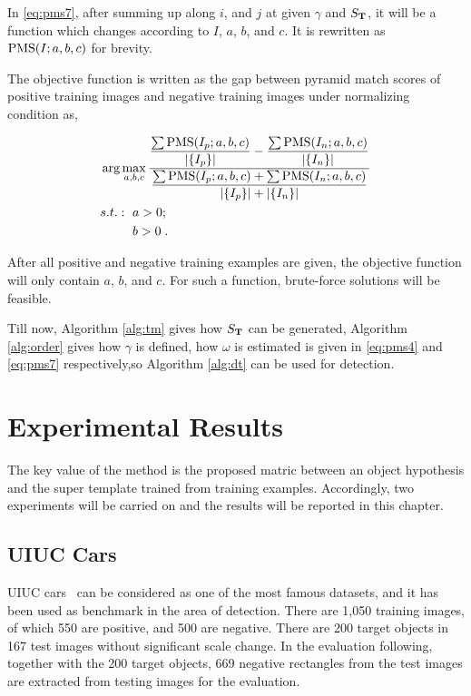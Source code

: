 In \ref{eq:pms7}, after summing up along $i$, and $j$ at given $\gamma$ and $S_{\bf T}$, it will be a function which changes according to $I$, $a$, $b$, and $c$. It is rewritten as ${\rm PMS}(I;a,b,c)$ for  brevity.

The objective function is written as the gap between pyramid match scores of positive training images and negative training images under normalizing condition as,

\[\begin{aligned}
&\arg \max\limits_{a,b,c} \dfrac{ \dfrac {\sum {\rm PMS}(I_p;a,b,c)}  {|\{ I_p \}|} - \dfrac {\sum {\rm PMS}(I_n;a,b,c)}  {|\{ I_n \}|} }
{\dfrac
{{\sum {\rm PMS}(I_p;a,b,c)}+ {\sum {\rm PMS}(I_n;a,b,c) }}
{|\{ I_p \}|+|\{ I_n \}|}
}\\
&\begin{aligned}
    s.t.:\mbox{ }& a>0;\\
    &b>0\;.
\end{aligned}
\end{aligned}
\]

After all positive and negative training examples are given, the objective function will only contain $a$, $b$, and $c$. For such a function, brute-force solutions will be feasible.

Till now, Algorithm \ref{alg:tm} gives how $S_{\bf T}$ can be generated,  Algorithm \ref{alg:order}  gives how $\gamma$ is defined, how $\omega$ is estimated is given in \ref{eq:pms4} and \ref{eq:pms7} respectively,so Algorithm \ref{alg:dt} can be used for detection.


\section{Experimental Results}
\label{exp5}
The key value of the method is the proposed matric between an object hypothesis and the super template trained from training examples. Accordingly, two experiments will be carried on and the results will be reported in this chapter.


\subsection{UIUC Cars}

UIUC cars~\citep{cds} can be considered as one of the most famous datasets, and it has been used as benchmark in the area of detection.
There are 1,050 training images, of which 550 are positive, and 500 are negative. There are 200 target objects in 167 test images without significant scale change. In the evaluation following, together with the 200 target objects, 669 negative rectangles from the test images are extracted from testing images for the evaluation.

